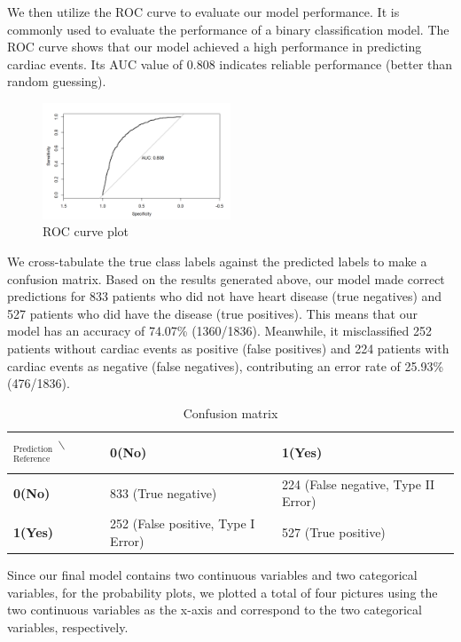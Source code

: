 \documentclass[12pt]{article}
\begin{document}
We then utilize the ROC curve to evaluate our model performance. It is commonly used to evaluate the performance of a binary classification model. The ROC curve shows that our model achieved a high performance in predicting cardiac events. Its AUC value of 0.808 indicates reliable performance (better than random guessing).



\begin{figure}[!ht]
\centering
\includegraphics[width=0.5\textwidth]{Img/roc.png}
\caption{ROC curve plot}
\end{figure}

We cross-tabulate the true class labels against the predicted labels to make a confusion matrix. Based on the results generated above, our model made correct predictions for 833 patients who did not have heart disease (true negatives) and 527 patients who did have the disease (true positives). This means that our model has an accuracy of 74.07\% (1360/1836). Meanwhile, it misclassified 252 patients without cardiac events as positive (false positives) and 224 patients with cardiac events as negative (false negatives), contributing an error rate of 25.93\% (476/1836).

\begin{table}[!ht]
\caption{Confusion matrix}
    \centering
    \begin{tabular}{|l|l|l|}
    \hline
        $_{\text{Prediction} }$ $\backslash$ $^{\text{Reference}}$  & \textbf{0(No)} &\textbf{ 1(Yes)}  \\ \hline
        \textbf{0(No) }& 833 (True negative) & 224 (False negative, Type II Error)  \\ \hline
        \textbf{1(Yes)} & 252 (False positive, Type I Error) & 527 (True positive)  \\ \hline
    \end{tabular}
\end{table}

\newpage
Since our final model contains two continuous variables and two categorical variables, for the probability plots, we plotted a total of four pictures using the two continuous variables as the x-axis and correspond to the two categorical variables, respectively.
\end{document}
